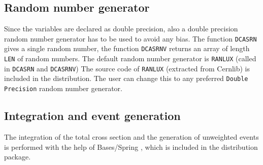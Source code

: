 \documentclass[11pt]{article} \usepackage{mystyle-new}
\begin{document}
\subsection{Random number generator}
Since the variables are declared as double precision, also a double precision
random number generator has to be used to avoid any bias. The function
\verb+DCASRN+ gives a single random number,  the function \verb+DCASRNV+ returns
an array of length \verb+LEN+ of random numbers. The default random number
generator is \verb+RANLUX+ (called in \verb+DCASRN+ and \verb+DCASRNV+)
The source code of \verb+RANLUX+  (extracted from  {\sc Cernlib}) is included in the distribution. 
The user can change this to any preferred \verb+Double Precision+
random number generator.
\subsection{Integration and event generation}
The integration of the total cross section and the generation of unweighted
events is performed with the help of {\sc Bases/Spring} \cite{bases}, which is
included in the distribution package.
\end{document}
